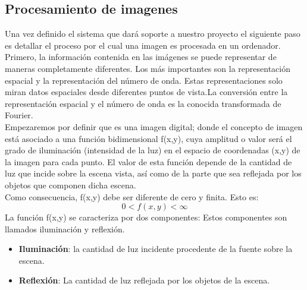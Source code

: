 \subsection{Procesamiento de imagenes}
Una vez definido el sistema que dará soporte a nuestro proyecto el siguiente paso es detallar el
proceso por el cual una imagen es procesada en un ordenador.\\
Primero, la información contenida en las imágenes se puede representar de maneras completamente diferentes.
Los más importantes son la representación espacial y la representación del número de onda. Estas representaciones solo
miran datos espaciales desde diferentes puntos de vista.La conversión entre la representación espacial y el número de
onda es la conocida transformada de Fourier.\cite{Book:Bernd1997} \\
Empezaremos por definir que es una imagen digital; donde el concepto de imagen está asociado a una función
bidimensional f(x,y), cuya amplitud o valor será el grado de iluminación (intensidad de la luz) en el espacio de
coordenadas (x,y) de la imagen para cada punto.\cite{Book:Arturo2011}
El valor de esta función depende de la
cantidad de luz que incide sobre la escena vista, así como de la parte que sea reflejada
por los objetos que componen dicha escena.\\
Como consecuencia, f(x,y) debe ser diferente de cero y finita. Esto es:
\begin{equation}
	0 < f(x,y) < \infty
\end{equation}
La función f(x,y) se caracteriza por dos componentes: Estos componentes son llamados
iluminación y reflexión.\cite{Book:Jose2005}
\begin{itemize}
	\item \textbf{Iluminación}: la cantidad de luz incidente procedente de la fuente sobre la
	      escena.
	\item \textbf{Reflexión}: La cantidad de luz reflejada por los objetos de la escena.
\end{itemize}

